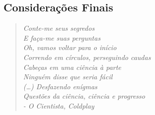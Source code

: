 \documentclass[
]{article}
\begin{document}
\hypertarget{considerauxe7uxf5es-finais}{%
\subsection{Considerações Finais}\label{considerauxe7uxf5es-finais}}

\begin{quote}
\emph{Conte-me seus segredos}\\
\emph{E faça-me suas perguntas}\\
\emph{Oh, vamos voltar para o início}\\
\emph{Correndo em círculos, perseguindo caudas}\\
\emph{Cabeças em uma ciência à parte}\\
\emph{Ninguém disse que seria fácil}\\
\emph{(\ldots) Desfazendo enígmas}\\
\emph{Questões da ciência, ciência e progresso}\\
\emph{- O Cientista, Coldplay}
\end{quote}
\end{document}

